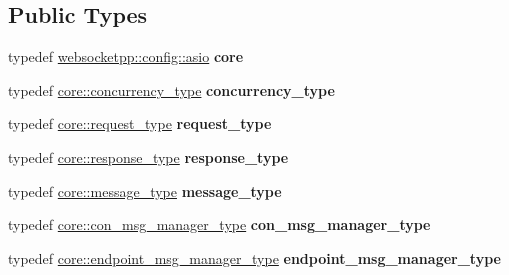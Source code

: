 \subsection*{Public Types}
\begin{DoxyCompactItemize}
\item 
typedef \hyperlink{structwebsocketpp_1_1config_1_1asio}{websocketpp\+::config\+::asio} {\bfseries core}\hypertarget{structcustom__config_a4e505eac8b901b897d22f98cbc111e40}{}\label{structcustom__config_a4e505eac8b901b897d22f98cbc111e40}

\item 
typedef \hyperlink{classwebsocketpp_1_1concurrency_1_1basic}{core\+::concurrency\+\_\+type} {\bfseries concurrency\+\_\+type}\hypertarget{structcustom__config_a0469587f21d5e47fb277573474b090fd}{}\label{structcustom__config_a0469587f21d5e47fb277573474b090fd}

\item 
typedef \hyperlink{classwebsocketpp_1_1http_1_1parser_1_1request}{core\+::request\+\_\+type} {\bfseries request\+\_\+type}\hypertarget{structcustom__config_a03dc77bd84f6cc15cd01a5d9887c88e4}{}\label{structcustom__config_a03dc77bd84f6cc15cd01a5d9887c88e4}

\item 
typedef \hyperlink{classwebsocketpp_1_1http_1_1parser_1_1response}{core\+::response\+\_\+type} {\bfseries response\+\_\+type}\hypertarget{structcustom__config_a4537941e01e93674d6fa64b2f97c23e1}{}\label{structcustom__config_a4537941e01e93674d6fa64b2f97c23e1}

\item 
typedef \hyperlink{classwebsocketpp_1_1message__buffer_1_1message}{core\+::message\+\_\+type} {\bfseries message\+\_\+type}\hypertarget{structcustom__config_aacf89133919af94588f72e29f0c128e4}{}\label{structcustom__config_aacf89133919af94588f72e29f0c128e4}

\item 
typedef \hyperlink{classwebsocketpp_1_1message__buffer_1_1alloc_1_1con__msg__manager}{core\+::con\+\_\+msg\+\_\+manager\+\_\+type} {\bfseries con\+\_\+msg\+\_\+manager\+\_\+type}\hypertarget{structcustom__config_a878c46ec3657bf17a837e2f0ba305650}{}\label{structcustom__config_a878c46ec3657bf17a837e2f0ba305650}

\item 
typedef \hyperlink{classwebsocketpp_1_1message__buffer_1_1alloc_1_1endpoint__msg__manager}{core\+::endpoint\+\_\+msg\+\_\+manager\+\_\+type} {\bfseries endpoint\+\_\+msg\+\_\+manager\+\_\+type}\hypertarget{structcustom__config_a47fc2091d64f5be16acbf15587f25af9}{}\label{structcustom__config_a47fc2091d64f5be16acbf15587f25af9}


\end{DoxyCompactItemize}

